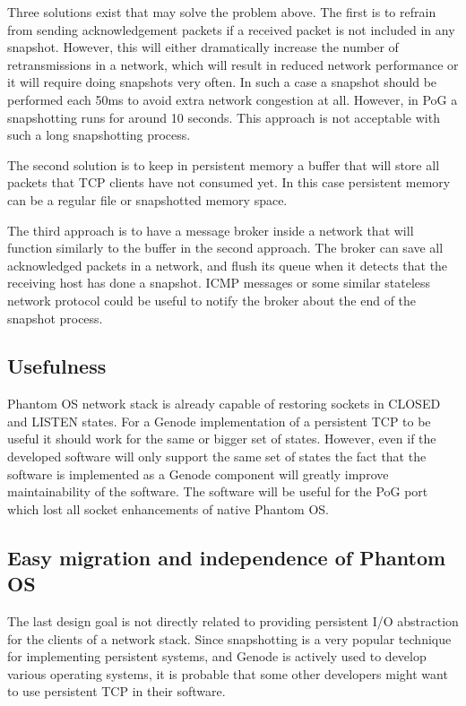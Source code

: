Three solutions exist that may solve the problem above. The first is to refrain
from sending acknowledgement packets if a received packet is not included in any
snapshot. However, this will either dramatically increase the number of
retransmissions in a network, which will result in reduced network performance
or it will require doing snapshots very often. In such a case a snapshot should
be performed each 50ms to avoid extra network congestion at all. However, in
PoG a snapshotting runs for around 10 seconds. This approach is not acceptable
with such a long snapshotting process.  

The second solution is to keep in persistent memory a buffer that will store
all packets that TCP clients have not consumed yet. In this case persistent
memory can be a regular file or snapshotted memory space. 

The third approach is to have a message broker inside a network that will
function similarly to the buffer in the second approach. The broker can save
all acknowledged packets in a network, and flush its queue when it detects that
the receiving host has done a snapshot. ICMP messages or some similar stateless
network protocol could be useful to notify the broker about the end of the
snapshot process.

\subsection {Usefulness}

Phantom OS network stack is already capable of restoring sockets in CLOSED and
LISTEN states. For a Genode implementation of a persistent TCP to be useful it
should work for the same or bigger set of states. However, even if the
developed software will only support the same set of states the fact that the
software is implemented as a Genode component will greatly improve
maintainability of the software. The software will be useful for the PoG port
which lost all socket enhancements of native Phantom OS.

\subsection {Easy migration and independence of Phantom OS}

The last design goal is not directly related to providing persistent I/O
abstraction for the clients of a network stack. Since snapshotting is a very
popular technique for implementing persistent systems, and Genode is actively
used to develop various operating systems, it is probable that some other
developers might want to use persistent TCP in their software.

